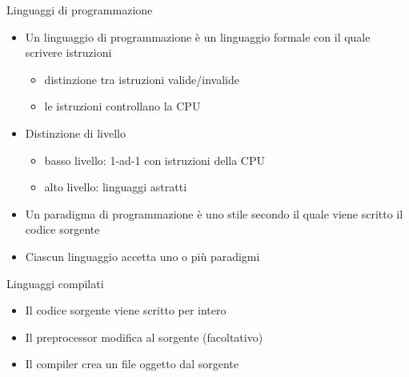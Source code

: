 \documentclass[xcolor=dvipsnames,handout]{beamer}
\begin{document}
\begin{frame}{Linguaggi di programmazione}
  \vfill
  \begin{itemize}
    \item Un \alert{linguaggio} di programmazione è un linguaggio \alert{formale}
    con il quale scrivere istruzioni
    \begin{itemize}
      \item distinzione tra istruzioni valide/invalide
      \item le istruzioni controllano la CPU
    \end{itemize}
    \vfill
    \item Distinzione di \alert{livello}
    \begin{itemize}
      \item basso livello: \alert{1-ad-1} con istruzioni della CPU
      \item alto livello: linguaggi \alert{astratti}
    \end{itemize}
    \vfill
    \item Un \alert{paradigma di programmazione} è uno stile secondo il quale
    viene scritto il codice sorgente
    \vfill
    \item Ciascun linguaggio accetta uno o più paradigmi
  \end{itemize}
  \vfill
\end{frame}

\begin{frame}{Linguaggi compilati}
  \vfill
  \begin{center}\end{center}
  \vfill
  \begin{itemize}
    \item Il codice sorgente viene scritto per intero \vfill
    \item Il \alert{preprocessor} modifica al sorgente (facoltativo) \vfill
    \item Il \alert{compiler} crea un file oggetto dal sorgente
  \end{itemize}
  \vfill
\end{frame}
\end{document}
